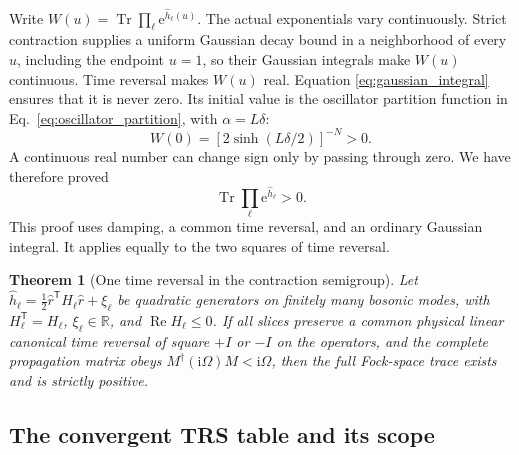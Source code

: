 \documentclass[11pt,a4paper]{article}
\newcommand{\Tr}{\operatorname{Tr}}
\newcommand{\ee}{\mathrm e}
\newcommand{\ii}{\mathrm i}
\newcommand{\trans}{\mathsf T}
\newtheorem{theorem}{Theorem}
\numberwithin{equation}{section}
\begin{document}
Write $W(u)=\Tr\prod_\ell\ee^{\hat h_\ell(u)}$. The actual exponentials
vary continuously. Strict contraction supplies a uniform Gaussian decay
bound in a neighborhood of every $u$, including the endpoint $u=1$,
so their Gaussian integrals make $W(u)$ continuous.
Time reversal makes $W(u)$ real. Equation
\eqref{eq:gaussian_integral} ensures that it is never zero. Its initial
value is the oscillator partition function in
Eq.~\eqref{eq:oscillator_partition}, with $\alpha=L\delta$:
\begin{equation}
 W(0)=\left[2\sinh(L\delta/2)\right]^{-N}>0.
 \label{eq:thermal_reference_trace}
\end{equation}
A continuous real number can change sign only by passing through zero.
We have therefore proved
\begin{equation}
 \boxed{\Tr\prod_\ell\ee^{\hat h_\ell}>0.}
 \label{eq:main_positive}
\end{equation}
This proof uses damping, a common time reversal, and an ordinary
Gaussian integral. It applies equally to the two squares of time reversal.

\begin{theorem}[One time reversal in the contraction semigroup]
\label{thm:contraction_trs}
Let
$\hat h_\ell=\frac12\hat r^\trans H_\ell\hat r+\xi_\ell$
be quadratic generators on finitely many bosonic modes, with
$H_\ell^\trans=H_\ell$, $\xi_\ell\in\mathbb R$, and
$\operatorname{Re}H_\ell\leq0$. If all slices preserve a common physical
linear canonical time reversal of square $+I$ or $-I$ on the operators, and
the complete propagation matrix obeys
$M^\dagger(\ii\Omega)M<\ii\Omega$, then the full Fock-space trace exists
and is strictly positive.
\end{theorem}

\subsection{The convergent TRS table and its scope}
\end{document}
